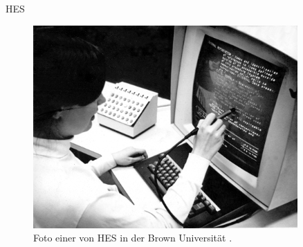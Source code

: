 \begin{section}{HES}
\begin{figure}[!ht]
	\centering
	\includegraphics[width=0.9\textwidth]{image/hes}
	\caption{Foto einer von HES in der Brown Universität \cite{Lloyd1969}.}
	\label{fig:hes}
\end{figure}

\end{section}

